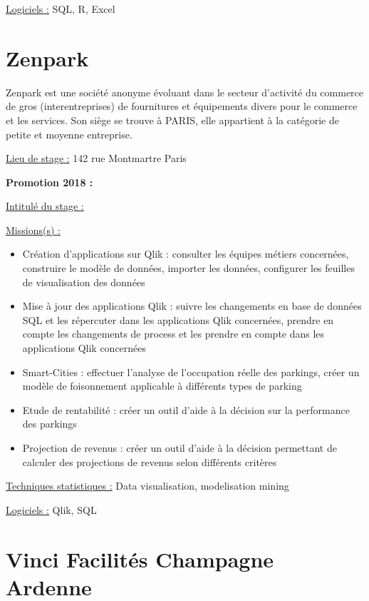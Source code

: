 \documentclass[
  letterpaper,
  DIV=11,
  numbers=noendperiod]{scrreprt}
\begin{document}
\uline{Logiciels :} SQL, R, Excel

\hypertarget{zenpark}{%
\section{\texorpdfstring{\textbf{Zenpark}}{Zenpark}}\label{zenpark}}

Zenpark est une société anonyme évoluant dans le secteur d'activité du
commerce de gros (interentreprises) de fournitures et équipements divers
pour le commerce et les services. Son siège se trouve à PARIS, elle
appartient à la catégorie de petite et moyenne entreprise.

\uline{Lieu de stage :} 142 rue Montmartre Paris

\textbf{Promotion 2018 :}

\uline{Intitulé du stage :}

\uline{Missions(s) :}

\begin{itemize}
\item
  Création d'applications sur Qlik : consulter les équipes métiers
  concernées, construire le modèle de données, importer les données,
  configurer les feuilles de visualisation des données
\item
  Mise à jour des applications Qlik : suivre les changements en base de
  données SQL et les répercuter dans les applications Qlik concernées,
  prendre en compte les changements de process et les prendre en compte
  dans les applications Qlik concernées
\item
  Smart-Cities : effectuer l'analyse de l'occupation réelle des
  parkings, créer un modèle de foisonnement applicable à différents
  types de parking
\item
  Etude de rentabilité : créer un outil d'aide à la décision sur la
  performance des parkings
\item
  Projection de revenus : créer un outil d'aide à la décision permettant
  de calculer des projections de revenus selon différents critères
\end{itemize}

\uline{Techniques statistiques :} Data visualisation, modelisation
mining

\uline{Logiciels :} Qlik, SQL

\hypertarget{vinci-facilituxe9s-champagne-ardenne}{%
\section{\texorpdfstring{\textbf{Vinci Facilités Champagne
Ardenne}}{Vinci Facilités Champagne Ardenne}}\label{vinci-facilituxe9s-champagne-ardenne}}
\end{document}
